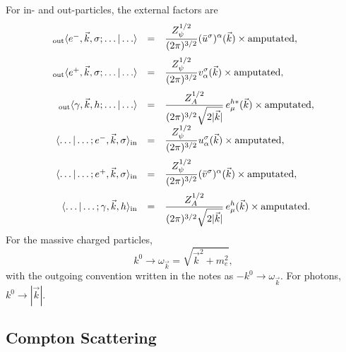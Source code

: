 For in- and out-particles, the external factors are
\[
\begin{array}{rcl}
{}_{\rm out}\langle e^-,\vec k,\sigma;\ldots|\ldots\rangle
&=&
\displaystyle
\frac{Z_\psi^{1/2}}{(2\pi)^{3/2}}
(\bar u^\sigma)^\alpha(\vec k)\times\hbox{amputated},
\\[1.2em]
{}_{\rm out}\langle e^+,\vec k,\sigma;\ldots|\ldots\rangle
&=&
\displaystyle
\frac{Z_\psi^{1/2}}{(2\pi)^{3/2}}
v^\sigma_\alpha(\vec k)\times\hbox{amputated},
\\[1.2em]
{}_{\rm out}\langle\gamma,\vec k,h;\ldots|\ldots\rangle
&=&
\displaystyle
\frac{Z_A^{1/2}}{(2\pi)^{3/2}\sqrt{2|\vec k|}}\,
e_\mu^{h*}(\vec k)\times\hbox{amputated},
\\[1.2em]
\langle\ldots|\ldots;e^-,\vec k,\sigma\rangle_{\rm in}
&=&
\displaystyle
\frac{Z_\psi^{1/2}}{(2\pi)^{3/2}}
u^\sigma_\alpha(\vec k)\times\hbox{amputated},
\\[1.2em]
\langle\ldots|\ldots;e^+,\vec k,\sigma\rangle_{\rm in}
&=&
\displaystyle
\frac{Z_\psi^{1/2}}{(2\pi)^{3/2}}
(\bar v^\sigma)^\alpha(\vec k)\times\hbox{amputated},
\\[1.2em]
\langle\ldots|\ldots;\gamma,\vec k,h\rangle_{\rm in}
&=&
\displaystyle
\frac{Z_A^{1/2}}{(2\pi)^{3/2}\sqrt{2|\vec k|}}\,
e_\mu^h(\vec k)\times\hbox{amputated}.
\end{array}
\]
For the massive charged particles,
\[
  k^0\to\omega_{\vec k}
  =
  \sqrt{\vec k^2+m_e^2},
\]
with the outgoing convention written in the notes as
\(-k^0\to\omega_{\vec k}\).  For photons, \(k^0\to|\vec k|\).

\subsection{Compton Scattering}

